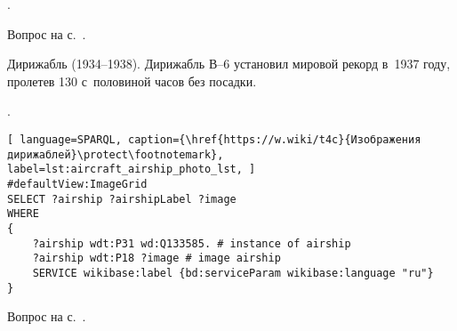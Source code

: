 \begin{task}
    \label{answer:aircraft_question_airship}
    . 
    
    \small{Вопрос на с.~\pageref{aircraft_question_4}.}
\end{task}


%
\begin{marginfigure}[3.2cm]
{%
\setlength{\fboxsep}{0pt}%
\setlength{\fboxrule}{1pt}%
%
}
    \caption{Дирижабль  (1934--1938). 
             Дирижабль В--6 установил мировой рекорд в~1937 году, 
             пролетев 130 с~половиной часов без посадки.
    }%
    \label{fig:airship-stamp}%
\end{marginfigure}
% 
\begin{task}
    \label{answer:aircraft_question_airship_2}
    . 
    
	\begin{lstlisting}[ language=SPARQL, caption={\href{https://w.wiki/t4c}{Изображения дирижаблей}\protect\footnotemark}, label=lst:aircraft_airship_photo_lst, ]
#defaultView:ImageGrid
SELECT ?airship ?airshipLabel ?image
WHERE
{
    ?airship wdt:P31 wd:Q133585. # instance of airship
  	?airship wdt:P18 ?image # image airship
    SERVICE wikibase:label {bd:serviceParam wikibase:language "ru"}
}
\end{lstlisting}
    
    \small{Вопрос на с.~\pageref{aircraft_question_5}.}
\end{task}


